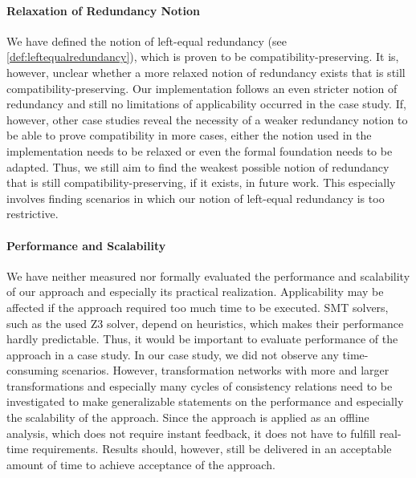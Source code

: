 \paragraph{Relaxation of Redundancy Notion}
We have defined the notion of left-equal redundancy (see \autoref{def:leftequalredundancy}), which is proven to be compatibility-preserving.
It is, however, unclear whether a more relaxed notion of redundancy exists that is still compatibility-preserving.
Our implementation follows an even stricter notion of redundancy and still no limitations of applicability occurred in the case study.
If, however, other case studies reveal the necessity of a weaker redundancy notion to be able to prove compatibility in more cases, either the notion used in the implementation needs to be relaxed or even the formal foundation needs to be adapted.
Thus, we still aim to find the weakest possible notion of redundancy that is still compatibility-preserving, if it exists, in future work.
This especially involves finding scenarios in which our notion of left-equal redundancy is too restrictive.

\paragraph{Performance and Scalability}
We have neither measured nor formally evaluated the performance and scalability of our approach and especially its practical realization.
Applicability may be affected if the approach required too much time to be executed.
\gls{SMT} solvers, such as the used Z3 solver, depend on heuristics, which makes their performance hardly predictable.
Thus, it would be important to evaluate performance of the approach in a case study.
In our case study, we did not observe any time-consuming scenarios.
However, transformation networks with more and larger transformations and especially many cycles of consistency relations need to be investigated to make generalizable statements on the performance and especially the scalability of the approach.
Since the approach is applied as an offline analysis, which does not require instant feedback, it does not have to fulfill real-time requirements.
Results should, however, still be delivered in an acceptable amount of time to achieve acceptance of the approach.

